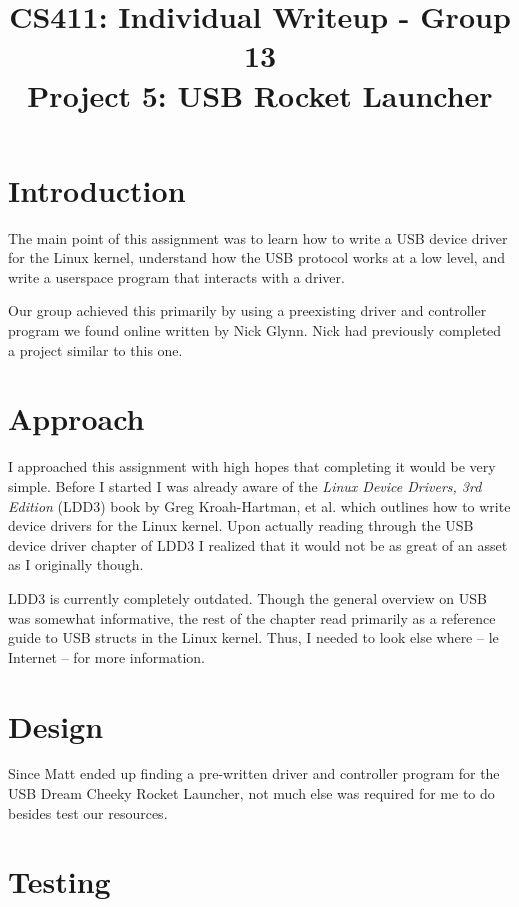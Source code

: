 \documentclass[letterpaper,10pt,titlepage]{article}
\title{CS411: Individual Writeup - Group 13\\
    Project 5: USB Rocket Launcher}
\author{\name}
\begin{document}
\maketitle

\section*{Introduction}

The main point of this assignment was to learn how to write a USB device
driver for the Linux kernel, understand how the USB protocol works at a
low level, and write a userspace program that interacts with a driver.

Our group achieved this primarily by using a preexisting driver and
controller program we found online written by Nick Glynn. Nick had
previously completed a project similar to this one. 

\section*{Approach}

I approached this assignment with high hopes that completing it would be
very simple. Before I started I was already aware of the \emph{Linux
Device Drivers, 3rd Edition} (LDD3) book by Greg Kroah-Hartman, et al. which
outlines how to write device drivers for the Linux kernel. Upon actually
reading through the USB device driver chapter of LDD3 I realized that
it would not be as great of an asset as I originally though. 

LDD3 is currently completely outdated. Though the general overview on
USB was somewhat informative, the rest of the chapter read primarily as
a reference guide to USB structs in the Linux kernel. Thus, I needed to
look else where -- le Internet -- for more information.

\section*{Design}

Since Matt ended up finding a pre-written driver and controller program
for the USB Dream Cheeky Rocket Launcher, not much else was required for
me to do besides test our resources.

\section*{Testing}
\end{document}
